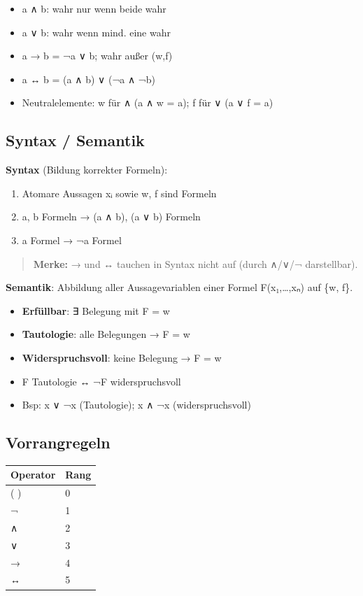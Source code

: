 \documentclass[11pt, a4paper]{article}
\begin{document}
\begin{itemize}
  \item a ∧ b: wahr nur wenn beide wahr
  \item a ∨ b: wahr wenn mind. eine wahr
  \item a → b = ¬a ∨ b; wahr außer (w,f)
  \item a ↔ b = (a ∧ b) ∨ (¬a ∧ ¬b)
  \item Neutralelemente: w für ∧ (a ∧ w = a); f für ∨ (a ∨ f = a)
\end{itemize}


\subsection{Syntax / Semantik}

\textbf{Syntax} (Bildung korrekter Formeln):

\begin{enumerate}
  \item Atomare Aussagen xᵢ sowie w, f sind Formeln
  \item a, b Formeln → (a ∧ b), (a ∨ b) Formeln
  \item a Formel → ¬a Formel
\end{enumerate}

\begin{quote}
\textbf{Merke:} → und ↔ tauchen in Syntax nicht auf (durch ∧/∨/¬ darstellbar).
\end{quote}

\textbf{Semantik}: Abbildung aller Aussagevariablen einer Formel F(x₁,…,xₙ) auf \{w, f\}.


\begin{itemize}
  \item \textbf{Erfüllbar}: ∃ Belegung mit F = w
  \item \textbf{Tautologie}: alle Belegungen → F = w
  \item \textbf{Widerspruchsvoll}: keine Belegung → F = w
  \item F Tautologie ↔ ¬F widerspruchsvoll
  \item Bsp: x ∨ ¬x (Tautologie); x ∧ ¬x (widerspruchsvoll)
\end{itemize}


\subsection{Vorrangregeln}


{\small
\begin{tabularx}{\linewidth}{XX}
\hline
\rowcolor{tableheadbg}
{\color{white}\textbf{Operator}} & {\color{white}\textbf{Rang}} \\[2pt]
\hline
\endhead
\hline
\endfoot
( ) & 0 \\
¬ & 1 \\
∧ & 2 \\
∨ & 3 \\
→ & 4 \\
↔ & 5 \\
\end{tabularx}
}
\end{document}

